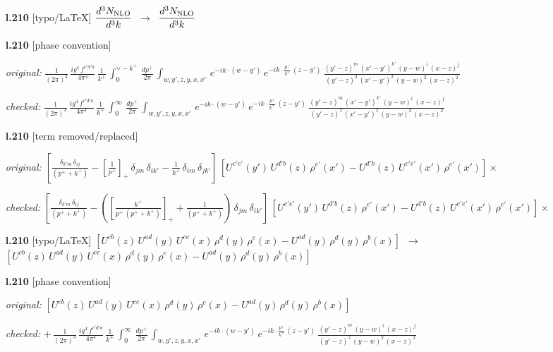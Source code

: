 \documentclass[10pt]{article}
\begin{document}
\begin{itemize}[leftmargin=2.2em,itemsep=1pt,topsep=2pt]
\item[\textbf{l.210}] \textsf{\small [typo/LaTeX]} $\displaystyle \frac{d^{3}N_{\rm NLO}}{d^{3}k}$\ $\longrightarrow$\ $\displaystyle \frac{d^{3}N_{\rm NLO}}{d^{3}k}$
\item[\textbf{l.210}] \textsf{\small [phase convention]} \par\noindent\emph{original:} $\displaystyle \frac{1}{(2\pi)^{3}}\, \frac{ig^{4}\,f^{c'd'a}}{4\pi^{4}}\, \frac{1}{k^{+}}\,\int_{0}^{\vee-k^{+}}\, \frac{dp^{+}}{2\pi}\, \int_{w,y',z,y,x,x'}\, e^{-ik\cdot (w-y')}\, e^{-ik\cdot \frac{p^{+}}{k^{+}}\,(z-y')}\, \frac{(y'-z)^{m}\,(x'-y')^{k'}\,(y-w)^{i}\,(x-z)^{j}}{(y'-z)^{2}\,(x'-y')^{2}\,(y-w)^{2}\,(x-z)^{2}}$\par\noindent\emph{checked:} $\displaystyle \frac{1}{(2\pi)^{3}}\, \frac{ig^{4}\,f^{c'd'a}}{4\pi^{4}}\, \frac{1}{k^{+}}\,\int_{0}^{\infty}\, \frac{dp^{+}}{2\pi}\, \int_{w,y',z,y,x,x'}\, e^{-ik\cdot (w-y')}\, e^{-ik\cdot \frac{p^{+}}{k^{+}}\,(z-y')}\,\frac{(y'-z)^{m}\,(x'-y')^{k'}\,(y-w)^{i}\,(x-z)^{j}}{(y'-z)^{2}\,(x'-y')^{2}\,(y-w)^{2}\,(x-z)^{2}}$
\item[\textbf{l.210}] \textsf{\small [term removed/replaced]} \par\noindent\emph{original:} $\displaystyle [\frac{\delta_{k'm}\,\delta_{ij}}{(p^{+}+k^{+})}-[\frac{1}{p^{+}}]_{+}\,\delta_{jm}\,\delta_{ik'}-\frac{1}{k^{+}}\, \delta_{im}\, \delta_{jk'}]\, [U^{c'e'}(y')\,U^{d'b}(z)\,\rho^{e'}(x')-U^{d'b}(z)\,U^{c'e'}(x')\,\rho^{e'}(x')]\times$\par\noindent\emph{checked:} $\displaystyle [\frac{\delta_{k'm}\,\delta_{ij}}{(p^{+}+k^{+})}-([\frac{k^{+}}{p^{+}\,(p^{+}+k^{+})}]_{+}+\frac{1}{(p^{+}+k^{+})})\,\delta_{jm}\,\delta_{ik'}]\, [U^{c'e'}(y')\,U^{d'b}(z)\,\rho^{e'}(x')-U^{d'b}(z)\,U^{c'e'}(x')\,\rho^{e'}(x')]\times$
\item[\textbf{l.210}] \textsf{\small [typo/LaTeX]} $\displaystyle [U^{cb}(z)\,U^{ad}(y)\,U^{ce}(x)\,\rho^{d}(y)\,\rho^{e}(x)-U^{ad}(y)\,\rho^{d}(y)\,\rho^{b}(x)]$\ $\longrightarrow$\ $\displaystyle [U^{cb}(z)\,U^{ad}(y)\,U^{ce}(x)\,\rho^{d}(y)\,\rho^{e}(x)-U^{ad}(y)\,\rho^{d}(y)\,\rho^{b}(x)]$
\item[\textbf{l.210}] \textsf{\small [phase convention]} \par\noindent\emph{original:} $\displaystyle [U^{cb}(z)\,U^{ad}(y)\,U^{ce}(x)\,\rho^{d}(y)\,\rho^{e}(x)-U^{ad}(y)\,\rho^{d}(y)\,\rho^{b}(x)]$\par\noindent\emph{checked:} $\displaystyle +\,\frac{1}{(2\pi)^{3}}\, \frac{ig^{4}\,f^{c'd'a}}{4\pi^{4}}\, \frac{1}{k^{+}}\,\int_{0}^{\infty}\, \frac{dp^{+}}{2\pi}\, \int_{w,y',z,y,x,x'}\, e^{-ik\cdot (w-y')}\, e^{-ik\cdot \frac{p^{+}}{k^{+}}\,(z-y')}\,\frac{(y'-z)^{m}\,(y-w)^{i}\,(x-z)^{j}}{(y'-z)^{2}\,(y-w)^{2}\,(x-z)^{2}}$

\end{itemize}
\end{document}
